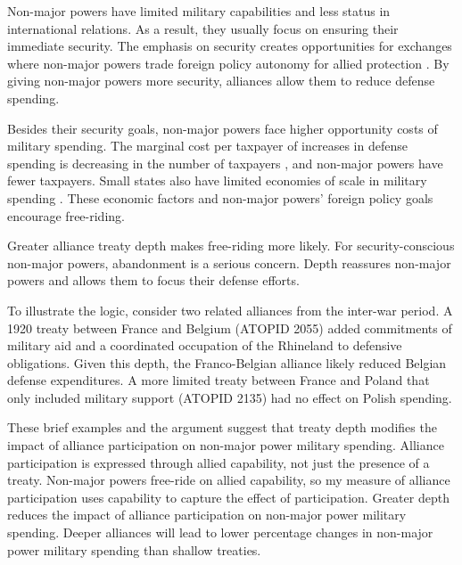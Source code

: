 \documentclass[12pt]{article}
\begin{document}
Non-major powers have limited military capabilities and less status in international relations. 
As a result, they usually focus on ensuring their immediate security.  
The emphasis on security creates opportunities for exchanges where non-major powers trade foreign policy autonomy for allied protection \citep{Altfield1984, Morrow1991}. 
By giving non-major powers more security, alliances allow them to reduce defense spending. 


Besides their security goals, non-major powers face higher opportunity costs of military spending. 
The marginal cost per taxpayer of increases in defense spending is decreasing in the number of taxpayers \citep{DudleyMontmarquette1981}, and non-major powers have fewer taxpayers. 
Small states also have limited economies of scale in military spending \citep{Moravcsik1991, Kapstein1991, Anderton1995, Devore2013}.
These economic factors and non-major powers' foreign policy goals encourage free-riding.  


Greater alliance treaty depth makes free-riding more likely. 
For security-conscious non-major powers, abandonment is a serious concern. 
Depth reassures non-major powers and allows them to focus their defense efforts. 


To illustrate the logic, consider two related alliances from the inter-war period. 
A 1920 treaty between France and Belgium (ATOPID 2055) added commitments of military aid and a coordinated occupation of the Rhineland to defensive obligations. 
Given this depth, the Franco-Belgian alliance likely reduced Belgian defense expenditures. 
A more limited treaty between France and Poland that only included military support (ATOPID 2135) had no effect on Polish spending.  
 
 
These brief examples and the argument suggest that treaty depth modifies the impact of alliance participation on non-major power military spending. 
Alliance participation is expressed through allied capability, not just the presence of a treaty. 
Non-major powers free-ride on allied capability, so my measure of alliance participation uses capability to capture the effect of participation. 
Greater depth reduces the impact of alliance participation on non-major power military spending. 
Deeper alliances will lead to lower percentage changes in non-major power military spending than shallow treaties. 
 
\end{document}
